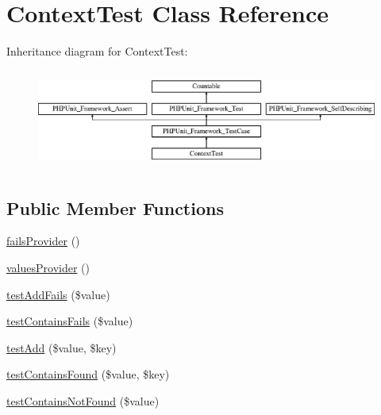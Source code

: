 \hypertarget{class_sebastian_bergmann_1_1_recursion_context_1_1_context_test}{}\section{Context\+Test Class Reference}
\label{class_sebastian_bergmann_1_1_recursion_context_1_1_context_test}
Inheritance diagram for Context\+Test\+:\begin{figure}[H]
\begin{center}
\leavevmode
\includegraphics[height=3.303835cm]{class_sebastian_bergmann_1_1_recursion_context_1_1_context_test}
\end{center}
\end{figure}
\subsection*{Public Member Functions}
\begin{DoxyCompactItemize}
\item 
\mbox{\hyperlink{class_sebastian_bergmann_1_1_recursion_context_1_1_context_test_af50eec3cda1f002bfaefa54a5347d39e}{fails\+Provider}} ()
\item 
\mbox{\hyperlink{class_sebastian_bergmann_1_1_recursion_context_1_1_context_test_a442cef3392c43ed9b9650a5fd3cbfeef}{values\+Provider}} ()
\item 
\mbox{\hyperlink{class_sebastian_bergmann_1_1_recursion_context_1_1_context_test_ab1a77d47a771fb6c02c1fd94f0750fcc}{test\+Add\+Fails}} (\$value)
\item 
\mbox{\hyperlink{class_sebastian_bergmann_1_1_recursion_context_1_1_context_test_af515003c3acdf75908e41bb7f80c29ef}{test\+Contains\+Fails}} (\$value)
\item 
\mbox{\hyperlink{class_sebastian_bergmann_1_1_recursion_context_1_1_context_test_a8e9046a24fbf95730c8fee2881d2d184}{test\+Add}} (\$value, \$key)
\item 
\mbox{\hyperlink{class_sebastian_bergmann_1_1_recursion_context_1_1_context_test_ab3632834d763289d577feac372971e6e}{test\+Contains\+Found}} (\$value, \$key)
\item 
\mbox{\hyperlink{class_sebastian_bergmann_1_1_recursion_context_1_1_context_test_a761c4a67baee648267e3ce6388bfada2}{test\+Contains\+Not\+Found}} (\$value)
\end{DoxyCompactItemize}
